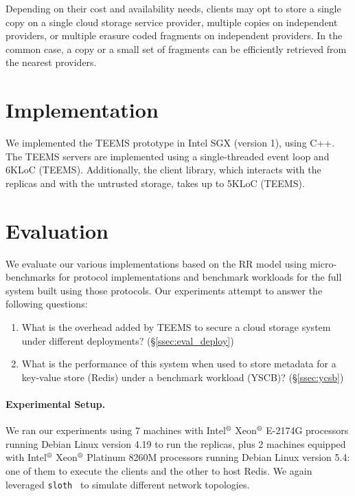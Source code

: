 Depending on their cost and availability needs, clients may opt to
store a single copy on a single cloud storage service provider,
multiple copies on independent providers, or multiple erasure coded
fragments on independent providers. In the common case, a copy or a
small set of fragments can be efficiently retrieved from the nearest
providers.


\section{Implementation}\label{sec:impl}


We implemented the \ac{TEEMS} prototype in Intel SGX (version 1),
using C++. The \ac{TEEMS} servers are implemented using a
single-threaded event loop and 6KLoC (\ac{TEEMS}). Additionally,
the client library, which interacts with the replicas and with
the untrusted storage, takes up to 5KLoC (\ac{TEEMS}).


\section{Evaluation}\label{sec:eval}


We evaluate our various implementations based on the \ac{RR}
model using micro-benchmarks for protocol implementations and
benchmark workloads for the full system built using those
protocols. Our experiments attempt to answer the following
questions:

\begin{enumerate}
    \item What is the overhead added by \ac{TEEMS} to secure a cloud storage system under different
      deployments?  (\S\ref{ssec:eval_deploy})
    \item What is the performance of this system  when used to store
      metadata for a key-value store (Redis) under a benchmark
      workload (YSCB)?
      (\S\ref{ssec:ycsb})
\end{enumerate}

\paragraph{Experimental Setup.}
We ran our experiments using 7 machines  with
Intel$^\text{\textregistered}$ Xeon$^\text{\textregistered}$ E-2174G
processors running Debian Linux version 4.19 to run the replicas,
plus 2 machines equipped with Intel$^\text{\textregistered}$
Xeon$^\text{\textregistered}$ Platinum 8260M processors running Debian
Linux version 5.4: one of them to execute the clients and the other to
host Redis.
%
We again leveraged \texttt{sloth}~\cite{sloth} to simulate
different network topologies.


